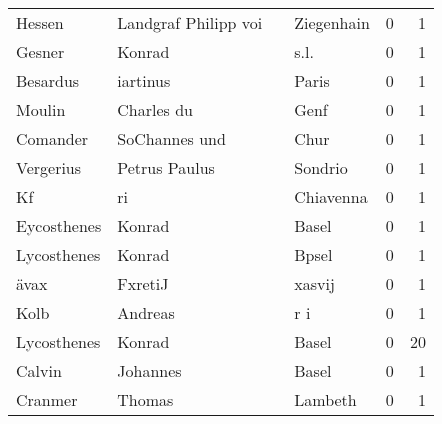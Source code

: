\begin{center}
\begin{tiny}
\begin{longtabu}{llllrr}
                   Hessen &               Landgraf Philipp voi &             &                                  Ziegenhain &          0 &         1 \\
                   Gesner &                             Konrad &             &                                        s.l. &          0 &         1 \\
                 Besardus &                           iartinus &             &                                       Paris &          0 &         1 \\
                   Moulin &                         Charles du &             &                                        Genf &          0 &         1 \\
                 Comander &                      SoChannes und &             &                                        Chur &          0 &         1 \\
                Vergerius &                      Petrus Paulus &             &                                     Sondrio &          0 &         1 \\
                       Kf &                                 ri &             &                                   Chiavenna &          0 &         1 \\
              Eycosthenes &                             Konrad &             &                                       Basel &          0 &         1 \\
              Lycosthenes &                             Konrad &             &                                       Bpsel &          0 &         1 \\
                     ävax &                            FxretiJ &             &                                      xasvij &          0 &         1 \\
                     Kolb &                            Andreas &             &                                         r i &          0 &         1 \\
              Lycosthenes &                             Konrad &             &                                       Basel &          0 &        20 \\
                   Calvin &                           Johannes &             &                                       Basel &          0 &         1 \\
                  Cranmer &                             Thomas &             &                                     Lambeth &          0 &         1 \\

\end{longtabu}
\end{tiny}
\end{center}
